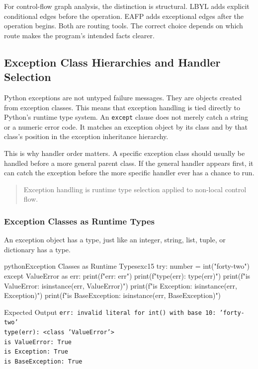 \documentclass[a4paper,twoside]{report}
\begin{document}
For control-flow graph analysis, the distinction is structural. LBYL adds explicit conditional edges before the operation. EAFP adds exceptional edges after the operation begins. Both are routing tools. The correct choice depends on which route makes the program's intended facts clearer.

\subsection{Exception Class Hierarchies and Handler Selection}

Python exceptions are not untyped failure messages. They are objects created from exception classes. This means that exception handling is tied directly to Python's runtime type system. An \texttt{except} clause does not merely catch a string or a numeric error code. It matches an exception object by its class and by that class's position in the exception inheritance hierarchy.

This is why handler order matters. A specific exception class should usually be handled before a more general parent class. If the general handler appears first, it can catch the exception before the more specific handler ever has a chance to run.

\begin{quote}
Exception handling is runtime type selection applied to non-local control flow.
\end{quote}

\subsubsection{Exception Classes as Runtime Types}

An exception object has a type, just like an integer, string, list, tuple, or dictionary has a type.

\begin{codebox}[]{python}{Exception Classes as Runtime Types}{exc15}
try:
    number = int("forty-two")
except ValueError as err:
    print(f"err: {err}")
    print(f"type(err): {type(err)}")
    print(f"is ValueError: {isinstance(err, ValueError)}")
    print(f"is Exception: {isinstance(err, Exception)}")
    print(f"is BaseException: {isinstance(err, BaseException)}")
\end{codebox}


\begin{iobox}{Expected Output}
\texttt{err: invalid literal for int() with base 10: 'forty-two'} \\
\texttt{type(err): <class 'ValueError'>} \\
\texttt{is ValueError: True} \\
\texttt{is Exception: True} \\
\texttt{is BaseException: True} \\
\end{iobox}
\end{document}
